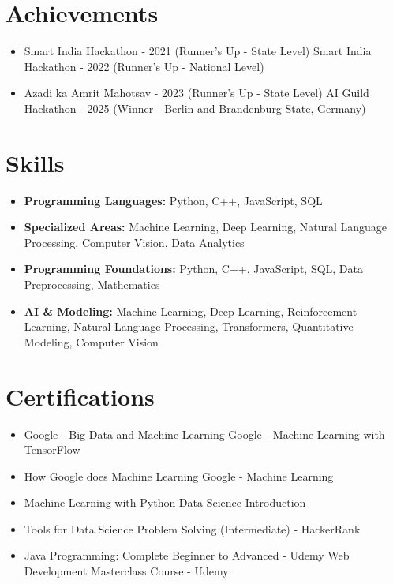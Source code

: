 \documentclass[a4paper,10pt]{article}
\begin{document}
\section*{Achievements}
\begin{itemize}
\item Smart India Hackathon - 2021 (Runner's Up - State Level) \hfill Smart India Hackathon - 2022 (Runner's Up - National Level)
\item Azadi ka Amrit Mahotsav - 2023 (Runner's Up - State Level) \hfill AI Guild Hackathon - 2025 (Winner - Berlin and Brandenburg State, Germany)
\end{itemize}

\section*{Skills}
\begin{itemize}
  \item \textbf{Programming Languages:} Python, C++, JavaScript, SQL
  \item \textbf{Specialized Areas:} Machine Learning, Deep Learning, Natural Language Processing, Computer Vision, Data Analytics
  \item \textbf{Programming Foundations:} Python, C++, JavaScript, SQL, Data Preprocessing, Mathematics
  \item \textbf{AI \& Modeling:} Machine Learning, Deep Learning, Reinforcement Learning, Natural Language Processing, Transformers, Quantitative Modeling, Computer Vision
\end{itemize}

\section*{Certifications}
\begin{itemize}
\item Google - Big Data and Machine Learning \hfill Google - Machine Learning with TensorFlow
\item How Google does Machine Learning \hfill Google - Machine Learning
\item Machine Learning with Python \hfill Data Science Introduction
\item Tools for Data Science \hfill Problem Solving (Intermediate) - HackerRank
\item Java Programming: Complete Beginner to Advanced - Udemy \hfill Web Development Masterclass Course - Udemy
\end{itemize}
\end{document}
